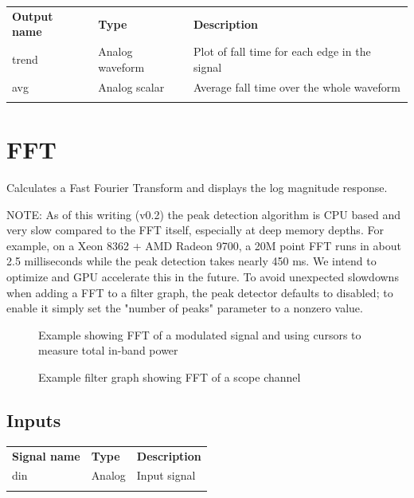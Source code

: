 \begin{tabularx}{16cm}{llX}
\thickhline
\textbf{Output name} & \textbf{Type} & \textbf{Description} \\
\thickhline
trend & Analog waveform & Plot of fall time for each edge in the signal\\
\thinhline
avg & Analog scalar & Average fall time over the whole waveform\\
\thickhline
\end{tabularx}

\pagebreak
\section{FFT}
\label{filter:fft}

Calculates a Fast Fourier Transform and displays the log magnitude response.

NOTE: As of this writing (v0.2) the peak detection algorithm is CPU based and very slow compared to the FFT itself,
especially at deep memory depths. For example, on a Xeon 8362 + AMD Radeon 9700, a 20M point FFT runs in about 2.5
milliseconds while the peak detection takes nearly 450 ms. We intend to optimize and GPU accelerate this in the
future. To avoid unexpected slowdowns when adding a FFT to a filter graph, the peak detector defaults to disabled; to
enable it simply set the "number of peaks" parameter to a nonzero value.

\begin{figure}[h]
\centering
{}
\caption{Example showing FFT of a modulated signal and using cursors to measure total in-band power}
\label{filter_fft}
\end{figure}

\begin{figure}[h]
\centering
{}
\caption{Example filter graph showing FFT of a scope channel}
\label{filter_graph_fft}
\end{figure}
\FloatBarrier

\subsection{Inputs}

\begin{tabularx}{16cm}{llX}
\thickhline
\textbf{Signal name} & \textbf{Type} & \textbf{Description} \\
\thickhline
din & Analog & Input signal\\
\thickhline
\end{tabularx}

